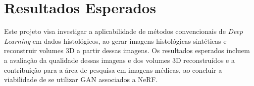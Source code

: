 \section{Resultados Esperados}

Este projeto visa investigar a aplicabilidade de métodos convencionais de \textit{Deep Learning} em dados histológicos, ao gerar imagens histológicas sintéticas e reconstruir volumes 3D a partir dessas imagens. Os resultados esperados incluem a avaliação da qualidade dessas imagens e dos volumes 3D reconstruídos e a contribuição para a área de pesquisa em imagens médicas, ao concluir a viabilidade de se utilizar GAN associados a NeRF.
